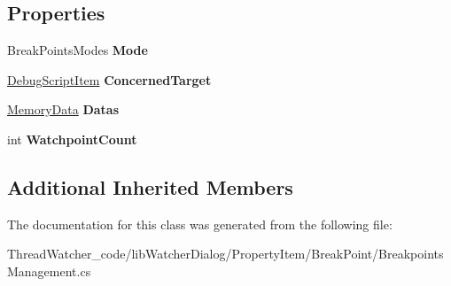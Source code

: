 \subsection*{Properties}
\begin{DoxyCompactItemize}
\item 
\hypertarget{classlib_watcher_dialog_1_1_property_item_1_1_break_point_1_1_breakpoints_management_a4bf59d5586bd0112ad0344b2d84d53e8}{Break\+Points\+Modes {\bfseries Mode}}\label{classlib_watcher_dialog_1_1_property_item_1_1_break_point_1_1_breakpoints_management_a4bf59d5586bd0112ad0344b2d84d53e8}

\item 
\hypertarget{classlib_watcher_dialog_1_1_property_item_1_1_break_point_1_1_breakpoints_management_a4ea3b59d6cf6a0bc0353bb6f6a83f50d}{\hyperlink{classlib_watcher_dialog_1_1_property_item_1_1_debug_script_1_1_debug_script_item}{Debug\+Script\+Item} {\bfseries Concerned\+Target}}\label{classlib_watcher_dialog_1_1_property_item_1_1_break_point_1_1_breakpoints_management_a4ea3b59d6cf6a0bc0353bb6f6a83f50d}

\item 
\hypertarget{classlib_watcher_dialog_1_1_property_item_1_1_break_point_1_1_breakpoints_management_a4a6afcc0b52a47834ca5cb644e49b140}{\hyperlink{classlib_watcher_dialog_1_1_property_item_1_1_break_point_1_1_memory_data}{Memory\+Data} {\bfseries Datas}}\label{classlib_watcher_dialog_1_1_property_item_1_1_break_point_1_1_breakpoints_management_a4a6afcc0b52a47834ca5cb644e49b140}

\item 
\hypertarget{classlib_watcher_dialog_1_1_property_item_1_1_break_point_1_1_breakpoints_management_a94d3cdd89049782ec39a192142ee50d1}{int {\bfseries Watchpoint\+Count}}\label{classlib_watcher_dialog_1_1_property_item_1_1_break_point_1_1_breakpoints_management_a94d3cdd89049782ec39a192142ee50d1}

\end{DoxyCompactItemize}
\subsection*{Additional Inherited Members}


The documentation for this class was generated from the following file\+:\begin{DoxyCompactItemize}
\item 
Thread\+Watcher\+\_\+code/lib\+Watcher\+Dialog/\+Property\+Item/\+Break\+Point/Breakpoints\+Management.\+cs\end{DoxyCompactItemize}
